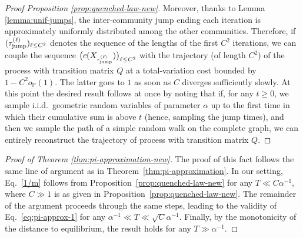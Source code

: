 \documentclass[11pt,oneside]{amsart}
\numberwithin{equation}{section}  %
\theoremstyle{plain}
\newcommand{\whp}{{w.h.p.~}}
\newcommand{\iid}{{i.i.d.~}}
\newcommand{\p}{\mathbb{P}}
\newcommand{\op}{o_{\p}}
\newcommand{\tauj}{\tau_{\textup{jump}}}
\begin{document}
\begin{proof}[Proof Proposition \ref{prop:quenched-law-new}]
Moreover, thanks to  Lemma \ref{lemma:unif-jumps}, the inter-community jump ending each iteration is approximately uniformly distributed among the other communities. Therefore, if $(\tauj^{({\ell})})_{{\ell} \le C^2}$ denotes the sequence of the lengths of the first $C^2$ iterations, we can couple the sequence $\big(c(X_{\tauj^{({\ell})}})\big)_{\ell\le C^2}$ with the trajectory (of length $C^2$) of the process with transition matrix $Q$ at a total-variation cost bounded by $1-C^2\op(1)$. The latter goes to $1$ as soon as $C$ diverges sufficiently slowly. At this point the desired result follows at once by noting that if, for any $t\ge0$, we sample \iid geometric random variables of parameter $\alpha$ up to the first time in which their cumulative sum is above $t$ (hence, sampling the jump times), and then we sample the path of a simple random walk on the complete graph, we can entirely reconstruct the trajectory of process with transition matrix $Q$.


\end{proof}

\begin{proof}[Proof of Theorem \ref{thm:pi-approximation-new}]
The proof of this fact follows the same line of argument as in Theorem~\ref{thm:pi-approximation}. 
In our setting, Eq.~\eqref{1/m} follows from Proposition~\ref{prop:quenched-law-new} 
for any $T \ll C\alpha^{-1}$, where $C \gg 1$ is as given
in Proposition~\ref{prop:quenched-law-new}.
The remainder of the argument proceeds through the same steps, leading to the validity of Eq.~\eqref{eq:pi-approx-1} 
for any $\alpha^{-1} \ll T \ll \sqrt{C}\alpha^{-1}$. Finally, by the monotonicity of the distance to equilibrium, 
the result holds for any $T \gg \alpha^{-1}$.
\end{proof}
\end{document}
